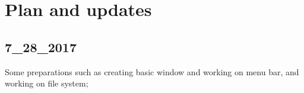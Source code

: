 

\chapter{Plan and updates}

\section{7\_28\_2017}
 Some preparations such as creating basic window and working on menu bar, and working on file system;

